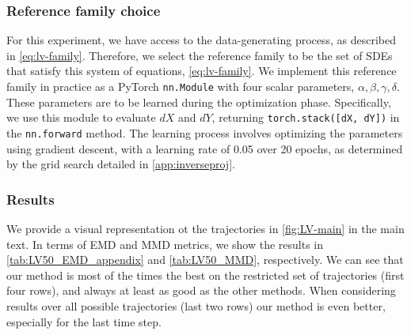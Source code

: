 \subsubsection{Reference family choice}
\label{app:LV_implementation}
 For this experiment, we have access to the data-generating process, as described in \cref{eq:lv-family}. Therefore, we select the reference family to be the set of SDEs that satisfy this system of equations, \cref{eq:lv-family}. We implement this reference family in practice as a PyTorch \texttt{nn.Module} with four scalar parameters, $\alpha, \beta, \gamma, \delta$. These parameters are to be learned during the optimization phase. Specifically, we use this module to evaluate $dX$ and $dY$, returning \texttt{torch.stack([dX, dY])} in the \texttt{nn.forward} method. The learning process involves optimizing the parameters using gradient descent, with a learning rate of 0.05 over 20 epochs, as determined by the grid search detailed in \cref{app:inverseproj}.


\subsubsection{Results} 
We provide a visual representation ot the trajectories in \cref{fig:LV-main} in the main text. In terms of EMD and MMD metrics, we show the results in \cref{tab:LV50_EMD_appendix} and \cref{tab:LV50_MMD}, respectively. We can see that our method is most of the times the best on the restricted set of trajectories (first four rows), and always at least as good as the other methods. When considering results over all possible trajectories (last two rows) our method is even better, especially for the last time step.

